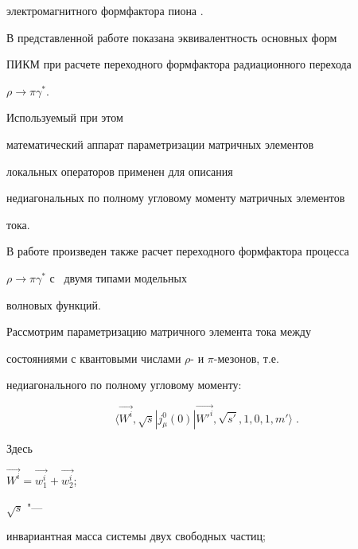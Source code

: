 электромагнитного формфактора пиона \cite{KrPol13-2}.



В представленной работе показана эквивалентность основных форм \linebreak

ПИКМ при расчете переходного формфактора радиационного перехода \linebreak

\mbox{$\rho  \to  \pi \gamma^{*}$}. 

Используемый при этом

математический аппарат параметризации матричных элементов

локальных операторов \cite{ShirCh63} применен для описания

недиагональных по полному угловому моменту матричных элементов

тока.



В работе произведен также расчет переходного формфактора процесса

\mbox{$\rho  \to  \pi \gamma^{*}$} с~ двумя типами модельных

волновых функций.



\smallskip




Рассмотрим параметризацию матричного элемента тока между

состояниями с квантовыми числами $\rho$- и $\pi$-мезонов, т.е.

недиагонального по полному угловому моменту:

\begin{equation}

\label{krutov:nodia}

 \langle\vec{W^{i}},\sqrt{s}|j_{\mu}^{0}(0)|\vec{W'^{i}},\sqrt{s'}, 1, 0, 1, m'\rangle\;.

 \end{equation}

Здесь

$\vec{W^{i}}=\vec{w^{i}_{1}}+{\vec{w^{i}_{2}}}$;

$\sqrt{s}$ "---

инвариантная масса системы двух свободных частиц;

